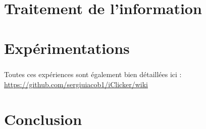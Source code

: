\documentclass[11pt,titlepage]{report}
\begin{document}
\chapter{Traitement de l'information}


\chapter{Expérimentations}
\paragraph{}
Toutes ces expériences sont également bien détaillées ici : \url{https://github.com/sergiuiacob1/iClicker/wiki}


\chapter{Conclusion}


\clearpage
\pagestyle{numberonly}

\printbibliography
\end{document}
